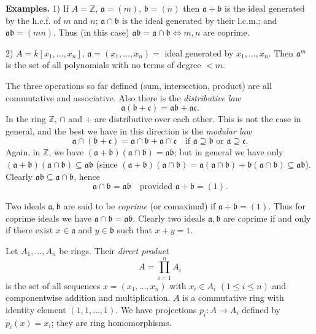 \medskip
\noindent\textbf{Examples.}  1) If $A=\mathbb Z$, $\mathfrak a=(m)$, $\mathfrak b=(n)$ then $\mathfrak a+\mathfrak b$ is the ideal generated by
the h.c.f. of $m$ and $n$; $\mathfrak a\cap\mathfrak b$ is the ideal generated by their l.c.m.; and $\mathfrak a\mathfrak b=(mn)$.
Thus (in this case) $\mathfrak a\mathfrak b=\mathfrak a\cap\mathfrak b\Longleftrightarrow m,n$ are coprime.

2) $A=k[x_1,\ldots,x_n]$, $\mathfrak a=(x_1,\ldots,x_n)={}$ ideal generated by $x_1,\ldots,x_n$.
Then $\mathfrak a^m$ is the set of all polynomials with no terms of degree $<m$.

The three operations so far defined (sum, intersection, product) are all
commutative and associative.  Also there is the \emph{distributive law}
\[
\mathfrak a(\mathfrak b+\mathfrak c)=\mathfrak a\mathfrak b+\mathfrak a\mathfrak c.
\]
In the ring $\mathbb Z$, $\cap$ and $+$ are distributive over each other.  This is not the case
in general, and the best we have in this direction is the \emph{modular law}
\[
\mathfrak a\cap(\mathfrak b+\mathfrak c)=\mathfrak a\cap\mathfrak b+\mathfrak a\cap\mathfrak c\quad\text{if }\mathfrak a\supseteq\mathfrak b\text{ or }\mathfrak a\supseteq\mathfrak c.
\]
Again, in $\mathbb Z$, we have $(\mathfrak a+\mathfrak b)(\mathfrak a\cap\mathfrak b)=\mathfrak a\mathfrak b$; but in general we have only
$(\mathfrak a+\mathfrak b)(\mathfrak a\cap\mathfrak b)\subseteq\mathfrak a\mathfrak b$ (since $(\mathfrak a+\mathfrak b)(\mathfrak a\cap\mathfrak b)=\mathfrak a(\mathfrak a\cap\mathfrak b)+\mathfrak b(\mathfrak a\cap\mathfrak b)\subseteq\mathfrak a\mathfrak b$).
Clearly $\mathfrak a\mathfrak b\subseteq\mathfrak a\cap\mathfrak b$, hence
\[
\mathfrak a\cap\mathfrak b=\mathfrak a\mathfrak b\quad\text{provided }\mathfrak a+\mathfrak b=(1).
\]

Two ideals $\mathfrak a,\mathfrak b$ are said to be \emph{coprime} (or comaximal) if $\mathfrak a+\mathfrak b=(1)$.  Thus
for coprime ideals we have $\mathfrak a\cap\mathfrak b=\mathfrak a\mathfrak b$.  Clearly two ideals $\mathfrak a,\mathfrak b$ are coprime if
and only if there exist $x\in\mathfrak a$ and $y\in\mathfrak b$ such that $x+y=1$.

Let $A_1,\ldots,A_n$ be rings.  Their \emph{direct product}
\[
A=\prod_{i=1}^n A_i
\]
is the set of all sequences $x=(x_1,\ldots,x_n)$ with $x_i\in A_i$ $(1\leq i\leq n)$ and componentwise addition and multiplication.  $A$ is a commutative ring with identity
element $(1,1,\ldots,1)$.  We have projections $p_i:A\longrightarrow A_i$ defined by $p_i(x)=x_i$;
they are ring homomorphisms.

